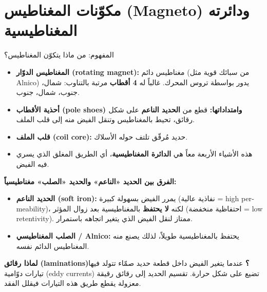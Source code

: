 \documentclass[11pt,a4paper]{article}
\newcommand{\en}[1]{\textenglish{#1}}
\begin{document}
\section{مكوّنات المغناطيس (\en{Magneto}) ودائرته المغناطيسية}

\begin{concept}{المفهوم: من ماذا يتكوّن المغناطيس؟}
\begin{itemize}
  \item \textbf{المغناطيس الدوّار (\en{rotating magnet}):} مغناطيس دائم (من سبائك قوية مثل \en{Alnico}) يدور بواسطة تروس المحرك. غالباً له \textbf{4 أقطاب} مرتبة بالتناوب: شمال، جنوب، شمال، جنوب.
  \item \textbf{أحذية الأقطاب (\en{pole shoes}) وامتداداتها:} قطع من \textbf{الحديد الناعم} على شكل رقائق، تحيط بالمغناطيس وتنقل الفيض منه إلى قلب الملف.
  \item \textbf{قلب الملف (\en{coil core}):} حديد مُرقّق تلتف حوله الأسلاك.
  \item هذه الأشياء الأربعة معاً هي \textbf{الدائرة المغناطيسية}، أي الطريق المغلق الذي يسري فيه الفيض.
\end{itemize}
\textbf{الفرق بين الحديد «الناعم» والحديد «الصلب» مغناطيسياً:}
\begin{itemize}
  \item \textbf{الحديد الناعم (\en{soft iron}):} يمرر الفيض بسهولة كبيرة (نفاذية عالية = \en{high permeability})، لكنه \textbf{لا يحتفظ} بالمغناطيسية بعد زوال المؤثر (احتفاظية منخفضة = \en{low retentivity}). ممتاز لنقل الفيض الذي يتغير اتجاهه باستمرار.
  \item \textbf{الصلب المغناطيسي / \en{Alnico}:} يحتفظ بالمغناطيسية طويلاً، لذلك يصنع منه المغناطيس الدائم نفسه.
\end{itemize}
\textbf{لماذا رقائق (\en{laminations})؟} عندما يتغير الفيض داخل قطعة حديد صمّاء تتولد فيها تيارات دوّامية (\en{eddy currents}) تضيع على شكل حرارة. تقسيم الحديد إلى رقائق رقيقة معزولة يقطع طريق هذه التيارات فيقلل الفقد.
\end{concept}
\end{document}
